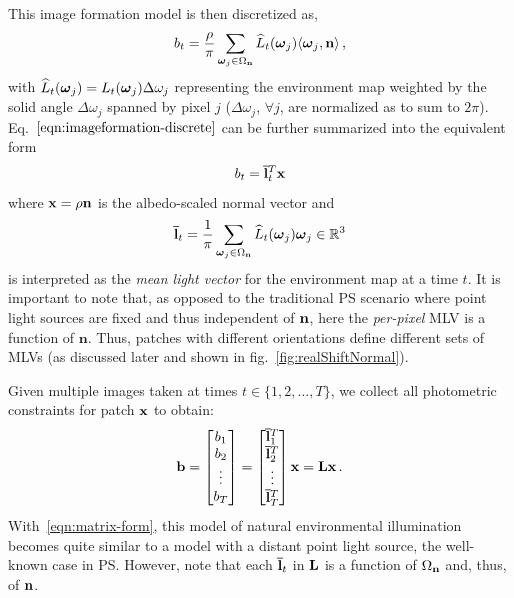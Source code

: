 This image formation model is then discretized as,
%
\begin{equation}
b_t = \frac{\rho}{\pi}\sum_{\boldsymbol \omega_j \in \Omega_{\bf n}} \widehat{L}_t(\boldsymbol \omega_j) \langle \boldsymbol \omega_j, {\bf n} \rangle\,,
\label{eqn:imageformation-discrete}
\end{equation}
%
with $\widehat{L}_t(\boldsymbol \omega_j) = L_t(\boldsymbol \omega_j)\Delta\omega_j$ representing the environment map weighted by the solid angle $\Delta\omega_j$ spanned by pixel $j$ ($\Delta\omega_j$, $\forall j$, are normalized as to sum to $2\pi$). Eq.~$\eqref{eqn:imageformation-discrete}$ can be further summarized into the equivalent form
%
\begin{equation}
b_t = {\bf \bar l}_t^T \mathbf{x}
\label{eqn:imageformation-simplified}
\end{equation}
where ${\bf x} = \rho {\bf n}$ is the albedo-scaled normal vector and
\begin{equation}
{\bf \bar l}_t = \frac{1}{\pi} \sum_{\boldsymbol \omega_j \in \Omega_{\bf n}} \widehat{L}_t(\boldsymbol \omega_j) \boldsymbol \omega_j \in \mathbb{R}^3
\label{eqn:mean-light}
\end{equation}
is interpreted as the {\em mean light vector} for the environment map at a time $t$. It is important to note that, as opposed to the traditional PS scenario where point light sources are fixed and thus independent of ${\bf n}$, here the {\em per-pixel} MLV is a function of $\mathbf{n}$. Thus, patches with different orientations define different sets of MLVs (as discussed later and shown in fig.~\ref{fig:realShiftNormal}).

Given multiple images taken at times $t \in \{1,2,\ldots,T\}$, we collect all photometric constraints for patch ${\bf x}$ to obtain:
\begin{equation}
\mathbf{b} =
\begin{bmatrix}
 b_1 \\ b_2 \\ \vdots \\ b_T
\end{bmatrix}
=
\begin{bmatrix}
 {\bf \bar l}_1^T \\ {\bf \bar l}_2^T \\ \vdots \\ {\bf \bar l}_T^T
\end{bmatrix}
{\bf x} = \mathbf{L} \mathbf{x} \,.
\label{eqn:matrix-form}
\end{equation}
With~\eqref{eqn:matrix-form}, this model of natural environmental illumination becomes quite similar to a model with a distant point light source, the well-known case in PS. However, note that each ${\bf \bar l}_t$ in ${\bf L}$ is a function of $\Omega_{\bf n}$ and, thus, of ${\bf n}$.

